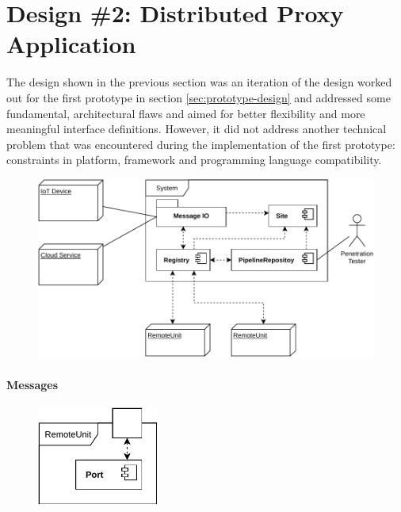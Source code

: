 \section{Design \#2: Distributed Proxy Application}
\label{sec:design-2}
The design shown in the previous section was an iteration of the design worked out for the first prototype in section \ref{sec:prototype-design} and addressed some fundamental, architectural flaws and aimed for better flexibility and more meaningful interface definitions. However, it did not address another technical problem that was encountered during the implementation of the first prototype: constraints in platform, framework and programming language compatibility. 

\begin{figure}[h]
    \centering
    \includegraphics[width=14cm]{img/ch05/component-view2-1.pdf}
    \label{fig:component-view2-1}
\end{figure}
\paragraph{Messages}
\begin{figure}[h]
    \centering
    \includegraphics[width=4cm]{img/ch05/component-view2-2-remote-unit.pdf}
    \label{fig:component-view2-2-remote-unit}
\end{figure}
